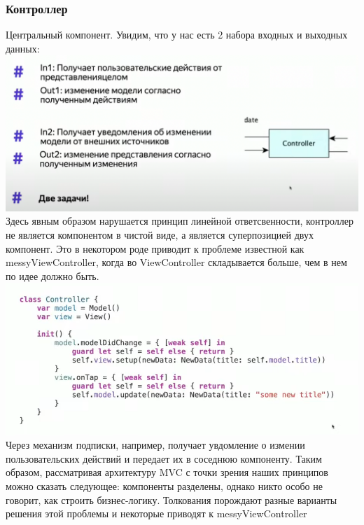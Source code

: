 \documentclass{article}
\begin{document}
    \subsubsection{Контроллер}
    Центральный компонент. Увидим, что у нас есть 2 набора входных и выходных данных: 
    \newline
    \includegraphics[scale = 0.5]{pic/Снимок экрана 2023-07-30 в 18.54.16.png}
    \newline
    Здесь явным образом нарушается принцип линейной ответсвенности, контроллер не является компонентом в чистой виде, а является суперпозицией двух компонент. Это в некотором роде приводит к проблеме известной как messyViewController, когда во ViewController складывается больше, чем в нем по идее должно быть. 
    \newline
    \includegraphics[scale = 0.5]{pic/Снимок экрана 2023-07-30 в 18.56.10.png}
    \newline
    Через механизм подписки, например, получает увдомление о измении пользовательских действий и передает их в соседнюю компоненту. 
    \newline
    Таким образом, рассматривая архитектуру MVC с точки зрения наших принципов можно сказать следующее: компоненты разделены, однако никто особо не говорит, как строить бизнес-логику. Толкования порождают разные варианты решения этой проблемы и некоторые приводят к messyViewController
    \newline
\end{document}
